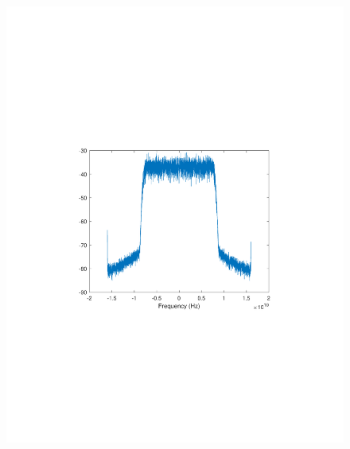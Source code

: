 \begin{refsection}
\begin{figure}[H]
	\centering
	\begin{minipage}{0.30\textwidth}
		\centering
		\includegraphics[clip, trim=4cm 8cm 4cm 8cm, width=1\textwidth]{./sdf/m_qam_system/figures/expResults/homodyne/5_16GBdInSig13dB_AfMIMO2.pdf}
		\label{fig:16GBdEyeMIMO2}
	\end{minipage}
	\begin{minipage}{0.30\textwidth}
		\centering

\end{minipage}
\end{figure}
\end{refsection}
